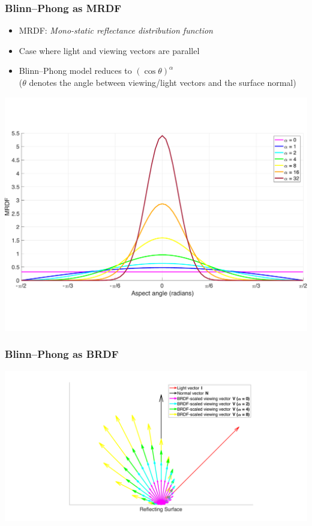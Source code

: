 \documentclass{beamer}
\begin{document}
\begin{frame}[t]
\frametitle{Blinn--Phong as MRDF}
\begin{itemize}
\item MRDF: \textit{Mono-static reflectance distribution function}
\item Case where light and viewing vectors are parallel
\item Blinn--Phong model reduces to $(\cos\theta)^\alpha$ \\
($\theta$ denotes the angle between viewing/light vectors and the surface normal)

\end{itemize}
\centerline{\includegraphics[scale=0.32]{./figs/MRDFs2}}
\end{frame}

\begin{frame}
\frametitle{Blinn--Phong as BRDF}
\centerline{\includegraphics[scale=0.4]{./figs/BRDF_Vectors.pdf}}
\end{frame}
\end{document}
